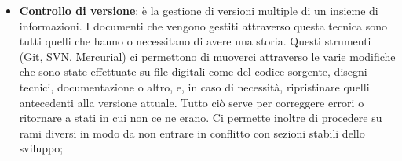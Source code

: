\begin{itemize}
	\item \textbf{Controllo di versione}:  è la gestione di versioni multiple di un insieme di informazioni. I documenti che vengono gestiti attraverso questa tecnica sono tutti quelli che hanno o necessitano di avere una storia.\newline
Questi strumenti (Git, SVN, Mercurial) ci permettono di muoverci attraverso le varie modifiche che sono state effettuate su file digitali come del codice sorgente, disegni tecnici, documentazione o altro, e, in caso di necessità, ripristinare quelli antecedenti alla versione attuale. \newline
Tutto ciò serve per correggere errori o ritornare a stati in cui non ce ne erano. Ci permette inoltre di procedere su rami diversi in modo da non entrare in conflitto con sezioni stabili dello sviluppo;

\end{itemize}